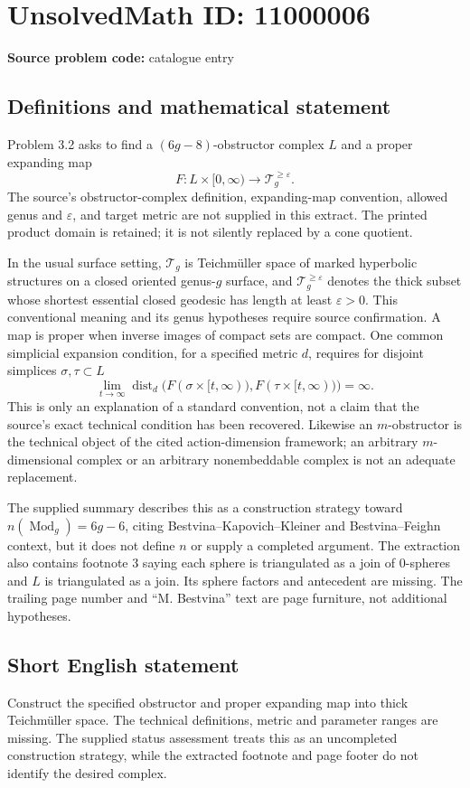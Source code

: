 \documentclass[11pt]{article}
\newcommand{\eps}{\varepsilon}
\begin{document}
\section*{UnsolvedMath ID: 11000006}
\textbf{Source problem code:} catalogue entry
\subsection{Definitions and mathematical statement}
Problem 3.2 asks to find a \((6g-8)\)-obstructor complex \(L\) and a proper expanding map
\[
 F:L\times[0,\infty)\longrightarrow\mathcal T_g^{\ge\eps}.
\]
The source's obstructor-complex definition, expanding-map convention, allowed genus and \(\eps\), and target metric are not supplied in this extract. The printed product domain is retained; it is not silently replaced by a cone quotient.

In the usual surface setting, \(\mathcal T_g\) is Teichmüller space of marked hyperbolic structures on a closed oriented genus-\(g\) surface, and \(\mathcal T_g^{\ge\eps}\) denotes the thick subset whose shortest essential closed geodesic has length at least \(\eps>0\). This conventional meaning and its genus hypotheses require source confirmation. A map is proper when inverse images of compact sets are compact. One common simplicial expansion condition, for a specified metric \(d\), requires for disjoint simplices \(\sigma,\tau\subset L\)
\[
 \lim_{t\to\infty}
 \operatorname{dist}_d\bigl(F(\sigma\times[t,\infty)),
                           F(\tau\times[t,\infty))\bigr)=\infty.
\]
This is only an explanation of a standard convention, not a claim that the source's exact technical condition has been recovered. Likewise an \(m\)-obstructor is the technical object of the cited action-dimension framework; an arbitrary \(m\)-dimensional complex or an arbitrary nonembeddable complex is not an adequate replacement.

The supplied summary describes this as a construction strategy toward \(n(\operatorname{Mod}_g)=6g-6\), citing Bestvina--Kapovich--Kleiner and Bestvina--Feighn context, but it does not define \(n\) or supply a completed argument. The extraction also contains footnote 3 saying each sphere is triangulated as a join of \(0\)-spheres and \(L\) is triangulated as a join. Its sphere factors and antecedent are missing. The trailing page number and ``M. Bestvina'' text are page furniture, not additional hypotheses.
\subsection{Short English statement}
Construct the specified obstructor and proper expanding map into thick Teichmüller space. The technical definitions, metric and parameter ranges are missing. The supplied status assessment treats this as an uncompleted construction strategy, while the extracted footnote and page footer do not identify the desired complex.
\end{document}
